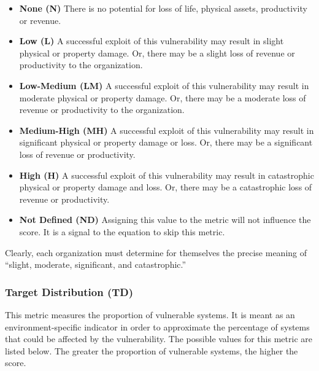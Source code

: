     \begin{itemize}
      \item
        \textbf{None (N)} There is no potential for loss of life, physical
        assets, productivity or revenue.
      \item
        \textbf{Low (L)} A successful exploit of this vulnerability may result
        in slight physical or property damage. Or, there may be a slight loss
        of revenue or productivity to the organization.
      \item
        \textbf{Low-Medium (LM)} A successful exploit of this vulnerability
        may result in moderate physical or property damage. Or, there may be a
        moderate loss of revenue or productivity to the organization.
      \item
        \textbf{Medium-High (MH)} A successful exploit of this vulnerability
        may result in significant physical or property damage or loss. Or,
        there may be a significant loss of revenue or productivity.
      \item
        \textbf{High (H)} A successful exploit of this vulnerability may
        result in catastrophic physical or property damage and loss. Or, there
        may be a catastrophic loss of revenue or productivity.
      \item
        \textbf{Not Defined (ND)} Assigning this value to the metric will not
        influence the score. It is a signal to the equation to skip this
        metric.
    \end{itemize}

    Clearly, each organization must determine for themselves the precise
    meaning of ``slight, moderate, significant, and catastrophic.''

    \subsubsection{Target Distribution (TD)}\label{subsec:target-distribution-td}

    This metric measures the proportion of vulnerable systems. It is meant
    as an environment-specific indicator in order to approximate the
    percentage of systems that could be affected by the vulnerability. The
    possible values for this metric are listed below. The greater the
    proportion of vulnerable systems, the higher the score.

